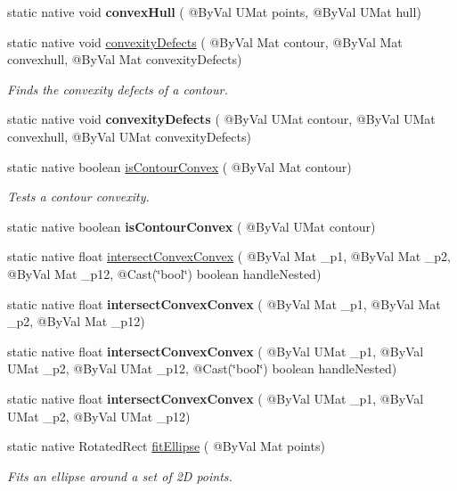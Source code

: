 \begin{DoxyCompactItemize}
\item 
static native void {\bfseries convex\+Hull} ( @By\+Val U\+Mat points, @By\+Val U\+Mat hull)
\item 
static native void \hyperlink{group__imgproc__shape_ga5947a188964bc225faa41c8281dd16a4}{convexity\+Defects} ( @By\+Val Mat contour, @By\+Val Mat convexhull, @By\+Val Mat convexity\+Defects)
\begin{DoxyCompactList}\small\item\em Finds the convexity defects of a contour. \end{DoxyCompactList}\item 
static native void {\bfseries convexity\+Defects} ( @By\+Val U\+Mat contour, @By\+Val U\+Mat convexhull, @By\+Val U\+Mat convexity\+Defects)
\item 
static native boolean \hyperlink{group__imgproc__shape_gad00ac2d87b83a753b5edcdbb2daf526f}{is\+Contour\+Convex} ( @By\+Val Mat contour)
\begin{DoxyCompactList}\small\item\em Tests a contour convexity. \end{DoxyCompactList}\item 
static native boolean {\bfseries is\+Contour\+Convex} ( @By\+Val U\+Mat contour)
\item 
static native float \hyperlink{group__imgproc__shape_ga1664076df6a9c8e2780c3650b12551a1}{intersect\+Convex\+Convex} ( @By\+Val Mat \+\_\+p1, @By\+Val Mat \+\_\+p2, @By\+Val Mat \+\_\+p12, @Cast(\char`\"{}bool\char`\"{}) boolean handle\+Nested)
\item 
static native float {\bfseries intersect\+Convex\+Convex} ( @By\+Val Mat \+\_\+p1, @By\+Val Mat \+\_\+p2, @By\+Val Mat \+\_\+p12)
\item 
static native float {\bfseries intersect\+Convex\+Convex} ( @By\+Val U\+Mat \+\_\+p1, @By\+Val U\+Mat \+\_\+p2, @By\+Val U\+Mat \+\_\+p12, @Cast(\char`\"{}bool\char`\"{}) boolean handle\+Nested)
\item 
static native float {\bfseries intersect\+Convex\+Convex} ( @By\+Val U\+Mat \+\_\+p1, @By\+Val U\+Mat \+\_\+p2, @By\+Val U\+Mat \+\_\+p12)
\item 
static native Rotated\+Rect \hyperlink{group__imgproc__shape_ga4e705f42eefa1224c87285653b6fb44d}{fit\+Ellipse} ( @By\+Val Mat points)
\begin{DoxyCompactList}\small\item\em Fits an ellipse around a set of 2D points. \end{DoxyCompactList}\item 

\end{DoxyCompactItemize}
